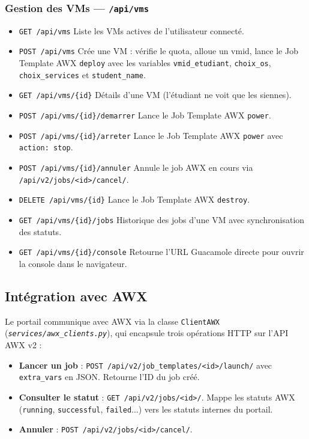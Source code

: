 \documentclass[a4paper]{article}
\newcommand{\cmd}[1]{\texttt{#1}}
\newcommand{\file}[1]{\texttt{\textit{#1}}}
\begin{document}
\subsubsection*{Gestion des VMs --- \texttt{/api/vms}}

\begin{itemize}
  \item \cmd{GET /api/vms} \quad Liste les VMs actives de l'utilisateur connecté.
  \item \cmd{POST /api/vms} \quad Crée une VM : vérifie le quota, alloue un vmid, lance le Job Template AWX \cmd{deploy} avec les variables \cmd{vmid\_etudiant}, \cmd{choix\_os}, \cmd{choix\_services} et \cmd{student\_name}.
  \item \cmd{GET /api/vms/\{id\}} \quad Détails d'une VM (l'étudiant ne voit que les siennes).
  \item \cmd{POST /api/vms/\{id\}/demarrer} \quad Lance le Job Template AWX \cmd{power}.
  \item \cmd{POST /api/vms/\{id\}/arreter} \quad Lance le Job Template AWX \cmd{power} avec \cmd{action: stop}.
  \item \cmd{POST /api/vms/\{id\}/annuler} \quad Annule le job AWX en cours via \cmd{/api/v2/jobs/<id>/cancel/}.
  \item \cmd{DELETE /api/vms/\{id\}} \quad Lance le Job Template AWX \cmd{destroy}.
  \item \cmd{GET /api/vms/\{id\}/jobs} \quad Historique des jobs d'une VM avec synchronisation des statuts.
  \item \cmd{GET /api/vms/\{id\}/console} \quad Retourne l'URL Guacamole directe pour ouvrir la console dans le navigateur.
\end{itemize}

\subsection{Intégration avec AWX}

Le portail communique avec AWX via la classe \cmd{ClientAWX} (\file{services/awx\_clients.py}), qui encapsule trois opérations HTTP sur l'API AWX v2 :

\begin{itemize}
  \item \textbf{Lancer un job} : \cmd{POST /api/v2/job\_templates/<id>/launch/} avec \cmd{extra\_vars} en JSON. Retourne l'ID du job créé.
  \item \textbf{Consulter le statut} : \cmd{GET /api/v2/jobs/<id>/}. Mappe les statuts AWX (\cmd{running}, \cmd{successful}, \cmd{failed}...) vers les statuts internes du portail.
  \item \textbf{Annuler} : \cmd{POST /api/v2/jobs/<id>/cancel/}.
\end{itemize}
\end{document}
